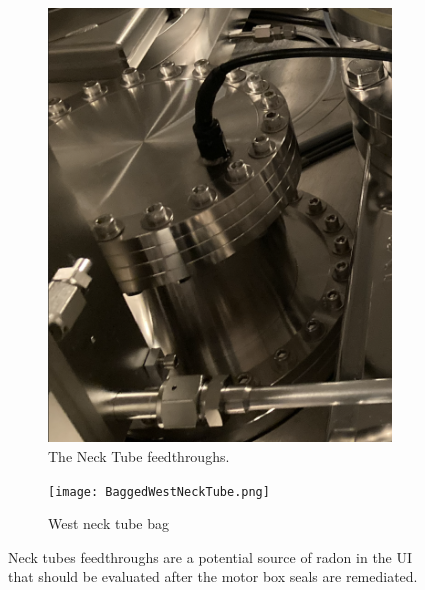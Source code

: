 \documentclass[11pt]{article}
\begin{document}
\begin{figure}[htbp]
\begin{center}
	\begin{subfigure}{0.45\textwidth}
	\includegraphics[width=\textwidth]{NeckTubeFeedthrough.png}
	\caption{The Neck Tube feedthroughs.}
	\label{fig:necktubefeedthrough}
	\end{subfigure}
	\begin{subfigure}{0.45\textwidth}
	\texttt{[image: BaggedWestNeckTube.png]}
	\caption{West neck tube bag}
	\label{fig:necktubebag}
	\end{subfigure}
\caption{Neck tubes feedthroughs are a potential source of radon in the UI that should be evaluated after the motor box seals are remediated.}
\label{fig:necktubes}
\end{center}
\end{figure}

	
\end{document}
